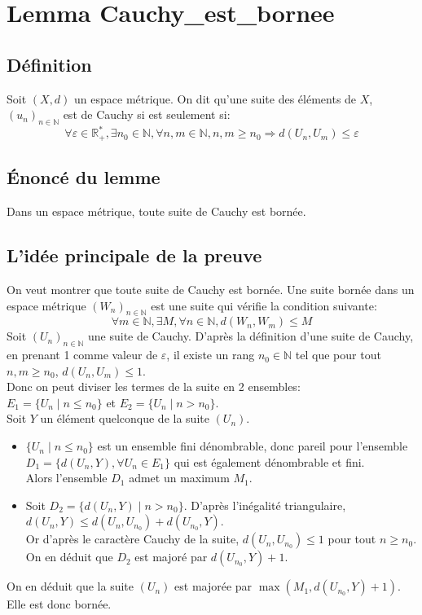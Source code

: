 \section{Lemma Cauchy\_est\_bornee}
\subsection{Définition}
Soit $(X,d)$ un espace métrique. On dit qu'une suite des éléments de $X$, $(u_n)_{n\in \mathbb{N}}$ est de Cauchy si est seulement si: $$\forall \varepsilon \in \mathbb{R_+^*}, \exists n_0 \in \mathbb{N}, \forall n,m \in \mathbb{N}, n,m \geq n_0 \Rightarrow d(U_n,U_m) \leq \varepsilon$$ 
\subsection{\'Enoncé du lemme}
Dans un espace métrique, toute suite de Cauchy est bornée.

\subsection{L'idée principale de la preuve}
On veut montrer que toute suite de Cauchy est bornée. Une suite bornée dans un espace métrique $(W_n)_{n\in\mathbb{N}}$ est une suite qui vérifie la condition suivante:$$ \forall m \in \mathbb{N}, \exists M , \forall n \in \mathbb{N}, d(W_n,W_m)\leq M $$
Soit $(U_n)_{n\in\mathbb{N}}$ une suite de Cauchy.
D'après la définition d'une suite de Cauchy, en prenant 1 comme valeur de $\varepsilon$, il existe un rang $n_0 \in \mathbb{N}$ tel que pour tout $n,m \geq n_0$, $d(U_n,U_m)\leq 1$.\\ Donc on peut diviser les termes de la suite en 2 ensembles: \\ $E_1=\big\{U_n\mid n\leq n_0 \big\}$ et $E_2=\big\{U_n\mid n > n_0 \big\}$. \\
Soit $Y$ un élément quelconque de la suite $(U_n)$.
\begin{itemize}
    \item $\big\{U_n\mid n\leq n_0 \big\}$ est un ensemble fini dénombrable, donc pareil pour l'ensemble $D_1=\big\{d(U_n,Y), \forall U_n\in E_1\big\}$ qui est également dénombrable et fini.\\ Alors l'ensemble $D_1$ admet un maximum $M_1$.
    \item Soit $D_2=\big\{d(U_n,Y)\mid n> n_0 \big\}$. D'après l'inégalité triangulaire, $d(U_n,Y)\leq d(U_n,U_{n_0})+d(U_{n_0},Y)$.\\ Or d'après le caractère Cauchy de la suite, $d(U_n,U_{n_0})\leq 1$ pour tout $n\geq n_0$.\\ On en déduit que $D_2$ est majoré par $d(U_{n_0},Y)+1$. 
\end{itemize}
On en déduit que la suite $(U_n)$ est majorée par $\max(M_1,d(U_{n_0},Y)+1)$. Elle est donc bornée.\\


